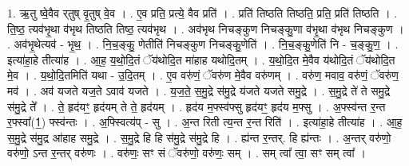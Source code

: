 \documentclass[17pt]{extarticle}
\begin{document}
1. ऋ॒तु ष्वे॒वैव र्‌तुष् वृ॒तुष् वे॒व । . ए॒व प्रति॒ प्रत्ये॒ वैव प्रति॑ । . प्रति॑ तिष्ठति तिष्ठति॒ प्रति॒ प्रति॑ तिष्ठति । . ति॒ष्ठ॒ त्यव॑भृ॒था व॑भृथ तिष्ठति तिष्ठ॒ त्यव॑भृथ । . अव॑भृथ निचङ्कुण निचङ्कु॒णा व॑भृ॒था व॑भृथ निचङ्कुण । . अव॑भृ॒थेत्यव॑ - भृ॒थ॒ । . नि॒च॒ङ्कु॒ णेतीति॑ निचङ्कुण निचङ्कु॒णेति॑ । . नि॒च॒ङ्कु॒णेति॑ नि - च॒ङ्कु॒ण॒ । . इत्या॑हा॒हे तीत्या॑ह । . आ॒ह॒ य॒थो॒दि॒तं ॅय॑थोदि॒त मा॑हाह यथोदि॒तम् । . य॒थो॒दि॒त मे॒वैव य॑थोदि॒तं ॅय॑थोदि॒त मे॒व । . य॒थो॒दि॒तमिति॑ यथा - उ॒दि॒तम् । . ए॒व वरु॑णं॒ ॅवरु॑ण मे॒वैव वरु॑णम् । . वरु॑ण॒ मवाव॒ वरु॑णं॒ ॅवरु॑ण॒ मव॑ । . अव॑ यजते यज॒ते ऽवाव॑ यजते । . य॒ज॒ते॒ स॒मु॒द्रे स॑मु॒द्रे य॑जते यजते समु॒द्रे । . स॒मु॒द्रे ते॑ ते समु॒द्रे स॑मु॒द्रे ते᳚ । . ते॒ हृद॑यꣳ॒॒ हृद॑यम् ते ते॒ हृद॑यम् । . हृद॑य म॒फ्स्व॑फ्सु हृद॑यꣳ॒॒ हृद॑य म॒फ्सु । . अ॒फ्स्व॑न्त र॒न्त र॒फ्स्वा᳚(1॒) फ्स्व॑न्तः । . अ॒फ्स्वित्य॑प् - सु । . अ॒न्त रिती त्य॒न्त र॒न्त रिति॑ । . इत्या॑हा॒हे तीत्या॑ह । . आ॒ह॒ स॒मु॒द्रे स॑मु॒द्र आ॑हाह समु॒द्रे । . स॒मु॒द्रे हि हि स॑मु॒द्रे स॑मु॒द्रे हि । . ह्य॑न्त र॒न्तर्. हि ह्य॑न्तः । . अ॒न्तर् वरु॑णो॒ वरु॑णो॒ ऽन्त र॒न्तर् वरु॑णः । . वरु॑णः॒ सꣳ सं ॅवरु॑णो॒ वरु॑णः॒ सम् । . सम् त्वा᳚ त्वा॒ सꣳ सम् त्वा᳚ । \newline
\end{document}
